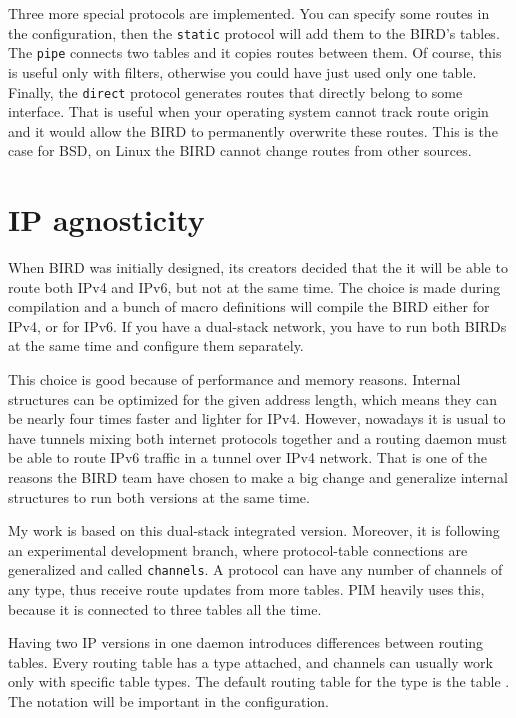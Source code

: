Three more special protocols are implemented. You can specify some routes in
the configuration, then the \texttt{static} protocol will add them to the BIRD's
tables. The \texttt{pipe} connects two tables and it copies routes between
them. Of course, this is useful only with filters, otherwise you could have
just used only one table. Finally, the \texttt{direct} protocol generates routes
that directly belong to some interface. That is useful when your operating
system cannot track route origin and it would allow the BIRD to permanently
overwrite these routes. This is the case for BSD, on Linux the BIRD cannot
change routes from other sources.

\section{IP agnosticity}
When BIRD was initially designed, its creators decided that the it will be able to
route both IPv4 and IPv6, but not at the same time. The choice is made during
compilation and a bunch of macro definitions will compile the BIRD either for
IPv4, or for IPv6. If you have a dual-stack network, you have to run both BIRDs
at the same time and configure them separately.

This choice is good because of performance and memory reasons. Internal
structures can be optimized for the given address length, which means they can be
nearly four times faster and lighter for IPv4. However, nowadays it is usual to
have tunnels mixing both internet protocols together and a routing daemon must
be able to route IPv6 traffic in a tunnel over IPv4 network. That is one of the
reasons the BIRD team have chosen to make a big change and generalize internal
structures to run both versions at the same time.

My work is based on this dual-stack integrated version. Moreover, it is
following an experimental development branch, where protocol-table connections
are generalized and called \texttt{channels}. A protocol can have any number of
channels of any type, thus receive route updates from more tables. PIM heavily
uses this, because it is connected to three tables all the time.

Having two IP versions in one daemon introduces differences between routing
tables. Every routing table has a type attached, and channels can usually work
only with specific table types. The default routing table for the type
 is the table . The notation will be important in the
configuration.

